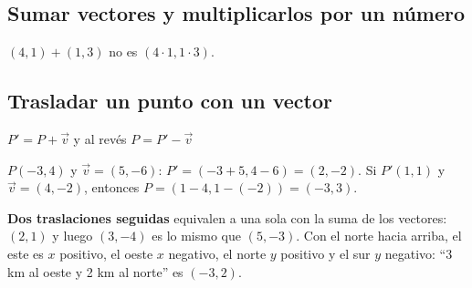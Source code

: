 \subsection{Sumar vectores y multiplicarlos por un número}
\begin{ojo} $(4, 1) + (1, 3)$ no es $(4 \cdot 1, 1 \cdot 3)$.\end{ojo}

\subsection{Trasladar un punto con un vector}
\begin{clave} $P' = P + \vec{v}$ \qquad y al revés \qquad $P = P' - \vec{v}$\end{clave}
\begin{ejemplo} $P(-3, 4)$ y $\vec{v} = (5, -6)$: $P' = (-3 + 5, 4 - 6) = (2, -2)$. Si $P'(1, 1)$ y $\vec{v} = (4, -2)$, entonces $P = (1 - 4, 1 - (-2)) = (-3, 3)$.\end{ejemplo}
\textbf{Dos traslaciones seguidas} equivalen a una sola con la suma de los vectores: $(2, 1)$ y luego $(3, -4)$ es lo mismo que $(5, -3)$. Con el norte hacia arriba, el este es $x$ positivo, el oeste $x$ negativo, el norte $y$ positivo y el sur $y$ negativo: ``3 km al oeste y 2 km al norte'' es $(-3, 2)$.

